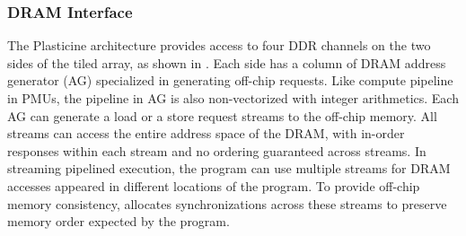 \subsubsection{DRAM Interface}
The Plasticine architecture provides access to four DDR channels on the two sides of the
tiled array, as shown in . 
Each side has a column of DRAM address generator (AG) specialized in generating off-chip
requests. Like compute pipeline in PMUs, the pipeline in AG is also non-vectorized with integer
arithmetics. Each AG can generate a load or a store request streams to the off-chip memory. All
streams can access the entire address space of the DRAM, with in-order responses within each stream
and no ordering guaranteed across streams. 
In streaming pipelined execution, the program can use multiple streams for DRAM accesses appeared in
different locations of the program.
To provide off-chip memory consistency, \name allocates
synchronizations across these streams to preserve memory order expected by the program.

